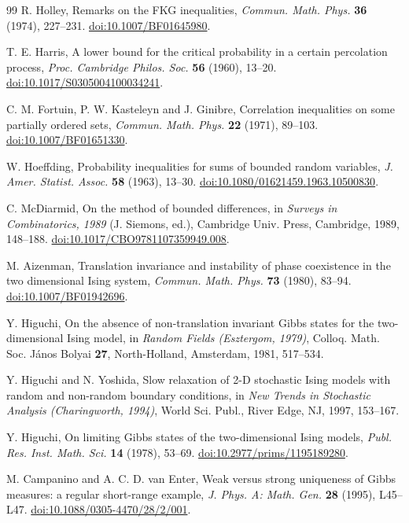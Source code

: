 \begin{thebibliography}{99}
R. Holley,
Remarks on the FKG inequalities,
\emph{Commun. Math. Phys.} \textbf{36} (1974), 227--231.
\href{https://doi.org/10.1007/BF01645980}{doi:10.1007/BF01645980}.

T. E. Harris,
A lower bound for the critical probability in a certain percolation process,
\emph{Proc. Cambridge Philos. Soc.} \textbf{56} (1960), 13--20.
\href{https://doi.org/10.1017/S0305004100034241}{doi:10.1017/S0305004100034241}.

C. M. Fortuin, P. W. Kasteleyn and J. Ginibre,
Correlation inequalities on some partially ordered sets,
\emph{Commun. Math. Phys.} \textbf{22} (1971), 89--103.
\href{https://doi.org/10.1007/BF01651330}{doi:10.1007/BF01651330}.

W. Hoeffding,
Probability inequalities for sums of bounded random variables,
\emph{J. Amer. Statist. Assoc.} \textbf{58} (1963), 13--30.
\href{https://doi.org/10.1080/01621459.1963.10500830}{doi:10.1080/01621459.1963.10500830}.

C. McDiarmid,
On the method of bounded differences,
in \emph{Surveys in Combinatorics, 1989} (J. Siemons, ed.), Cambridge Univ. Press, Cambridge, 1989, 148--188.
\href{https://doi.org/10.1017/CBO9781107359949.008}{doi:10.1017/CBO9781107359949.008}.

M. Aizenman,
Translation invariance and instability of phase coexistence in the two dimensional Ising system,
\emph{Commun. Math. Phys.} \textbf{73} (1980), 83--94.
\href{https://doi.org/10.1007/BF01942696}{doi:10.1007/BF01942696}.

Y. Higuchi,
On the absence of non-translation invariant Gibbs states for the two-dimensional Ising model,
in \emph{Random Fields (Esztergom, 1979)}, Colloq. Math. Soc. J\'anos Bolyai \textbf{27},
North-Holland, Amsterdam, 1981, 517--534.

Y. Higuchi and N. Yoshida,
Slow relaxation of 2-D stochastic Ising models with random and non-random boundary conditions,
in \emph{New Trends in Stochastic Analysis (Charingworth, 1994)}, World Sci. Publ., River Edge, NJ, 1997, 153--167.

Y. Higuchi,
On limiting Gibbs states of the two-dimensional Ising models,
\emph{Publ. Res. Inst. Math. Sci.} \textbf{14} (1978), 53--69.
\href{https://doi.org/10.2977/prims/1195189280}{doi:10.2977/prims/1195189280}.

M. Campanino and A. C. D. van Enter,
Weak versus strong uniqueness of Gibbs measures: a regular short-range example,
\emph{J. Phys. A: Math. Gen.} \textbf{28} (1995), L45--L47.
\href{https://doi.org/10.1088/0305-4470/28/2/001}{doi:10.1088/0305-4470/28/2/001}.


\end{thebibliography}
